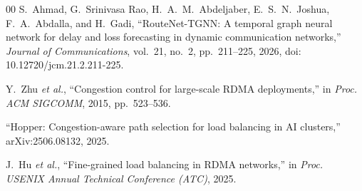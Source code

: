 \documentclass[conference]{IEEEtran}
\begin{document}
\begin{thebibliography}{00}
S.~Ahmad, G.~Srinivasa Rao, H.~A.~M.~Abdeljaber, E.~S.~N.~Joshua, F.~A.~Abdalla, and H.~Gadi, ``RouteNet-TGNN: A temporal graph neural network for delay and loss forecasting in dynamic communication networks,'' \emph{Journal of Communications}, vol.~21, no.~2, pp.~211--225, 2026, doi: 10.12720/jcm.21.2.211-225.

Y.~Zhu \emph{et al.}, ``Congestion control for large-scale RDMA deployments,'' in \emph{Proc. ACM SIGCOMM}, 2015, pp.~523--536.

``Hopper: Congestion-aware path selection for load balancing in AI clusters,'' arXiv:2506.08132, 2025.

J.~Hu \emph{et al.}, ``Fine-grained load balancing in RDMA networks,'' in \emph{Proc. USENIX Annual Technical Conference (ATC)}, 2025.

\end{thebibliography}
\end{document}
